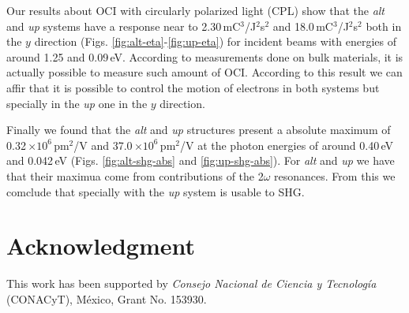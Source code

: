 \documentclass[pss]{wiley2sp} %
\begin{document}
Our results about OCI with circularly polarized light (CPL) show that the \emph{alt}  and \emph{up} systems have a response near to 2.30\,mC$^{3}$/J$^{2}$s$^{2}$ and 18.0\,mC$^{3}$/J$^{2}$s$^{2}$ both in the $y$ direction (Figs. \ref{fig:alt-eta}-\ref{fig:up-eta}) for incident beams with energies of around 1.25 and 0.09\,eV. According to measurements done on bulk materials, it is actually possible to measure such amount of OCI. According to this result we can affir that it is possible to control the motion of electrons in both systems but specially in the \emph{up} one in the $y$ direction.

Finally we found that the \emph{alt} and \emph{up} structures present a absolute maximum of 0.32\,$\times10^{6} $\,pm$^{2}$/V and 37.0\,$\times10^{6} $\,pm$^{2}$/V at the photon energies of around 0.40\,eV and 0.042\,eV (Figs. \ref{fig:alt-shg-abs} and \ref{fig:up-shg-abs}). For \emph{alt} and \emph{up} we have that their maximua come from contributions of the 2$\omega$ resonances. From this we comclude that specially with the \emph{up} system is usable to SHG.


\section{Acknowledgment} %

This work has been supported by \emph{Consejo Nacional de Ciencia y
Tecnolog\'ia} (CONACyT), M\'exico, Grant No. 153930.




\end{document}
